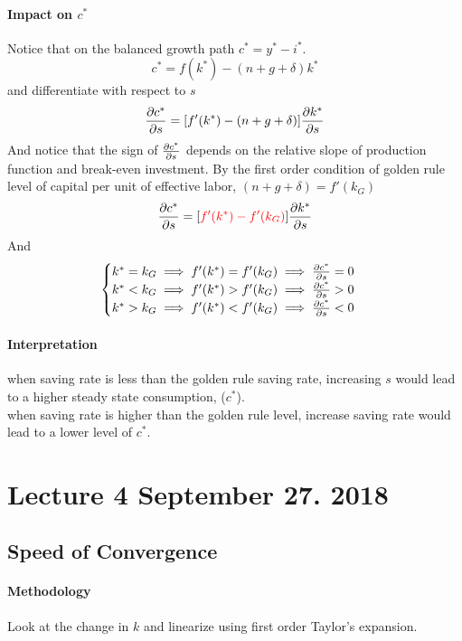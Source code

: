 \documentclass[11pt]{article}
\begin{document}
			\paragraph{Impact on $c^*$} Notice that on the balanced growth path $c^* = y^* - i^*$.
			\begin{equation}
				c^* = f(k^*) - (n+g+\delta)k^*
			\end{equation}
			and differentiate with respect to $s$
			\begin{equation}
				\frac{\partial{c^*}}{\partial{s}} = [f'(k^*) - (n+g+\delta)] \frac{\partial{k^*}}{\partial{s}}
			\end{equation}
			And notice that the sign of $\frac{\partial{c^*}}{\partial{s}}$ depends on the relative slope of production function and break-even investment.
			By the first order condition of golden rule level of capital per unit of effective labor, $(n+g+\delta) = f'(k_G)$
			\begin{gather}
				\frac{\partial{c^*}}{\partial{s}} = [\textcolor{red}{f'(k^*) - f'(k_G)}]\frac{\partial{k^*}}{\partial{s}}
			\end{gather}
			And 
			\begin{equation*}
				\begin{cases}
					k^* = k_G \implies f'(k^*) = f'(k_G) \implies \frac{\partial{c^*}}{\partial{s}} = 0 \\
					k^* < k_G \implies f'(k^*) > f'(k_G) \implies \frac{\partial{c^*}}{\partial{s}} > 0 \\
					k^* > k_G \implies f'(k^*) < f'(k_G) \implies \frac{\partial{c^*}}{\partial{s}} < 0
				\end{cases}
			\end{equation*}
		\paragraph{Interpretation} when saving rate is less than the golden rule saving rate, increasing $s$ would lead to a higher steady state consumption, ($c^*$). \\
		when saving rate is higher than the golden rule level, increase saving rate would lead to a lower level of $c^*$.
	\section{Lecture 4 September 27. 2018}
	\subsection{Speed of Convergence}
	    \paragraph{Methodology} Look at the change in $k$ and linearize using first order Taylor's expansion.
\end{document}
